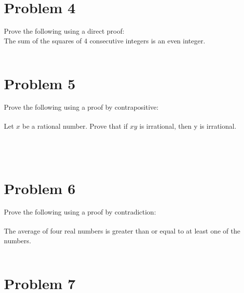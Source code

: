 \documentclass{amsart}
\theoremstyle{definition}
\theoremstyle{Exercise}
\theoremstyle{remark}
\theoremstyle{rule}
\numberwithin{equation}{section}
\begin{document}
 \newpage
\section*{Problem 4}
Prove the following using a direct proof:
\\

The sum of the squares of 4 consecutive integers is an even integer.
\\\\


 \newpage
\section*{Problem 5}

Prove the following using a proof by contrapositive:
\\\\

Let $x$ be a rational number. Prove that if $xy$ is irrational, then y is irrational.\\\\
\\\\




 \newpage

\section*{Problem 6}
Prove the following using a proof by contradiction:
\\\\


The average of four real numbers is greater than or equal to at least one of the numbers.
\\\\



 \newpage

\section*{Problem 7}
\end{document}
